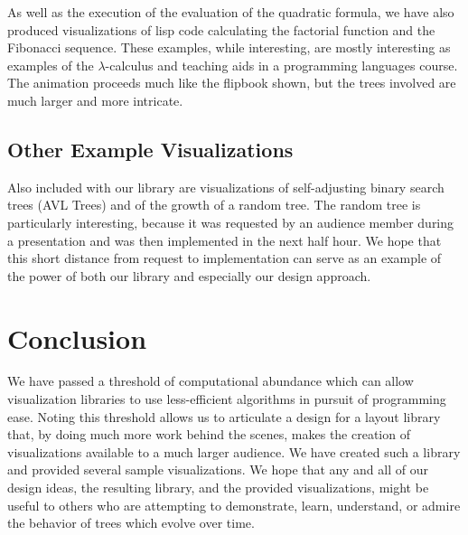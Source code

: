 \documentclass{article}
\begin{document}
As well as the execution of the evaluation of the quadratic formula, we have
also produced visualizations of lisp code calculating the factorial function
and the Fibonacci sequence.  These examples, while interesting, are mostly
interesting as examples of the $\lambda$-calculus and teaching aids in a
programming languages course.  The animation proceeds much like the flipbook
shown, but the trees involved are much larger and more intricate.

\subsection{Other Example Visualizations}

Also included with our library are visualizations of self-adjusting binary
search trees (AVL Trees) and of the growth of a random tree.  The random tree
is particularly interesting, because it was requested by an audience member
during a presentation and was then implemented in the next half hour.  We hope
that this short distance from request to implementation can serve as an example
of the power of both our library and especially our design approach.

\section{Conclusion}

We have passed a threshold of computational abundance which can allow
visualization libraries to use less-efficient algorithms in pursuit of
programming ease.  Noting this threshold allows us to articulate a design for a
layout library that, by doing much more work behind the scenes, makes the
creation of visualizations available to a much larger audience.  We have
created such a library and provided several sample visualizations.  We hope
that any and all of our design ideas, the resulting library\cite{ourlibrary},
and the provided visualizations, might be useful to others who are attempting
to demonstrate, learn, understand, or admire the behavior of trees which evolve
over time.



\end{document}
